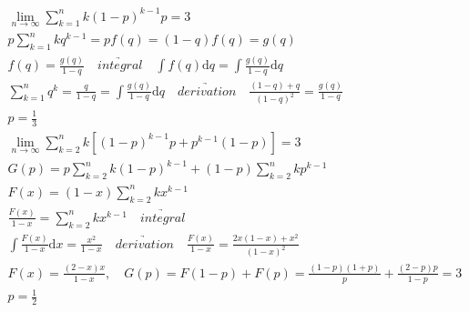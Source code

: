 \documentclass{article}
\begin{document}
\clearpage 

\begin{align*}
    \lim_{n \to \infty}\sum_{k=1}^{n} k(1-p)^{k-1} p = 3 \\
    p\sum_{k=1}^{n}kq^{k-1} = pf(q) = (1-q)f(q) = g(q)\\
    f(q) = \frac{g(q)}{1-q} \quad \underrightarrow{integral} \quad \int f(q) \mathrm{d}q = \int \frac{g(q)}{1-q}\mathrm{d}q\\
    \sum_{k=1}^{n}q^{k} = \frac{q}{1-q} = \int \frac{g(q)}{1-q}\mathrm{d}q \quad \underrightarrow{derivation} \quad \frac{(1-q)+q}{(1-q)^2} = \frac{g(q)}{1-q}\\
    p = \frac{1}{3} \\ 
    \lim_{n \to \infty}\sum_{k=2}^{n} k[(1-p)^{k-1}p + p^{k-1}(1-p)] = 3 \\ 
    G(p) = p\sum_{k=2}^{n}k(1-p)^{k-1} + (1-p)\sum_{k=2}^{n}kp^{k-1} \\
    F(x) = (1-x)\sum_{k=2}^{n}kx^{k-1} \\ \frac{F(x)}{1-x} = \sum_{k=2}^{n}kx^{k-1} \quad \underrightarrow{integral} \quad \\
    \int \frac{F(x)}{1-x} \mathrm{d}x = \frac{x^2}{1-x} \quad \underrightarrow{derivation} \quad \frac{F(x)}{1-x} = \frac{2x(1-x)+x^2}{(1-x)^2}\\
    F(x) = \frac{(2-x)x}{1-x}, \quad G(p) = F(1-p) + F(p) = \frac{(1-p)(1+p)}{p} + \frac{(2-p)p}{1-p} = 3\\
    p = \frac{1}{2} \\ 
\end{align*}
\end{document}
